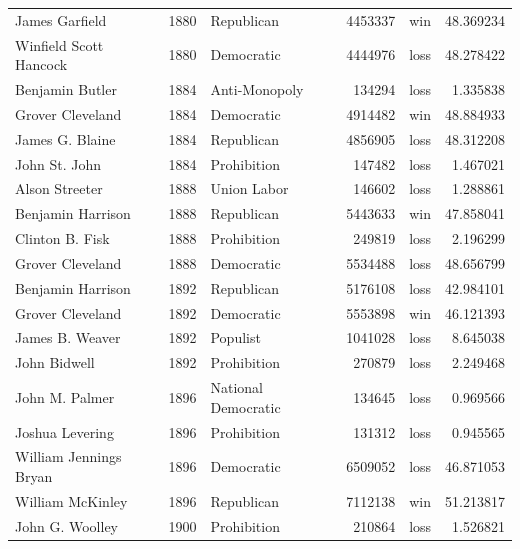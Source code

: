 \documentclass[
  letterpaper,
  DIV=11,
  numbers=noendperiod]{scrreprt}
\begin{document}
\begin{tabular}{lrlrlr}
James Garfield         &  1880 &             Republican &       4453337 &    win &  48.369234 \\
Winfield Scott Hancock &  1880 &             Democratic &       4444976 &   loss &  48.278422 \\
Benjamin Butler        &  1884 &          Anti-Monopoly &        134294 &   loss &   1.335838 \\
Grover Cleveland       &  1884 &             Democratic &       4914482 &    win &  48.884933 \\
James G. Blaine        &  1884 &             Republican &       4856905 &   loss &  48.312208 \\
John St. John          &  1884 &            Prohibition &        147482 &   loss &   1.467021 \\
Alson Streeter         &  1888 &            Union Labor &        146602 &   loss &   1.288861 \\
Benjamin Harrison      &  1888 &             Republican &       5443633 &    win &  47.858041 \\
Clinton B. Fisk        &  1888 &            Prohibition &        249819 &   loss &   2.196299 \\
Grover Cleveland       &  1888 &             Democratic &       5534488 &   loss &  48.656799 \\
Benjamin Harrison      &  1892 &             Republican &       5176108 &   loss &  42.984101 \\
Grover Cleveland       &  1892 &             Democratic &       5553898 &    win &  46.121393 \\
James B. Weaver        &  1892 &               Populist &       1041028 &   loss &   8.645038 \\
John Bidwell           &  1892 &            Prohibition &        270879 &   loss &   2.249468 \\
John M. Palmer         &  1896 &    National Democratic &        134645 &   loss &   0.969566 \\
Joshua Levering        &  1896 &            Prohibition &        131312 &   loss &   0.945565 \\
William Jennings Bryan &  1896 &             Democratic &       6509052 &   loss &  46.871053 \\
William McKinley       &  1896 &             Republican &       7112138 &    win &  51.213817 \\
John G. Woolley        &  1900 &            Prohibition &        210864 &   loss &   1.526821 \\

\end{tabular}
\end{document}
